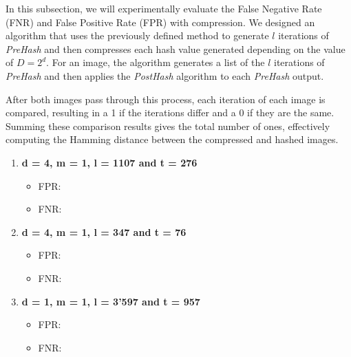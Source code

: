 In this subsection, we will experimentally evaluate the False Negative Rate (FNR) and False Positive Rate (FPR) with compression. We designed an algorithm that uses the previously defined method to generate \( l \) iterations of \textit{PreHash} and then compresses each hash value generated depending on the value of \(D = 2^d\). For an image, the algorithm generates a list of the \( l \) iterations of \textit{PreHash} and then applies the \textit{PostHash} algorithm to each \textit{PreHash} output.

After both images pass through this process, each iteration of each image is compared, resulting in a 1 if the iterations differ and a 0 if they are the same. Summing these comparison results gives the total number of ones, effectively computing the Hamming distance between the compressed and hashed images.

\begin{enumerate}
    \item \textbf{d = 4, m = 1, l = 1107 and t = 276}
        \begin{itemize}
            \item FPR: 
            \item FNR: 
        \end{itemize}
    \item \textbf{d = 4, m = 1, l = 347 and t = 76}
        \begin{itemize}
            \item FPR: 
            \item FNR: 
        \end{itemize}
    \item \textbf{d = 1, m = 1, l = 3'597 and t = 957}
        \begin{itemize}
            \item FPR: 
            \item FNR: 
        \end{itemize}
\end{enumerate}
